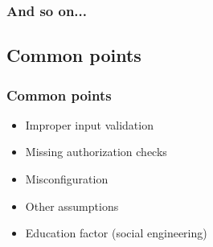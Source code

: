
\begin{frame}
\frametitle{And so on...}
\end{frame}

\subsection{Common points}

\begin{frame}
\frametitle{Common points}
\pause
\begin{itemize}
\item<+-> Improper input validation
\item<+-> Missing authorization checks
\item<+-> Misconfiguration
\item<+-> Other assumptions
\item<+-> Education factor {\small (social engineering)}
\end{itemize}
\end{frame}

